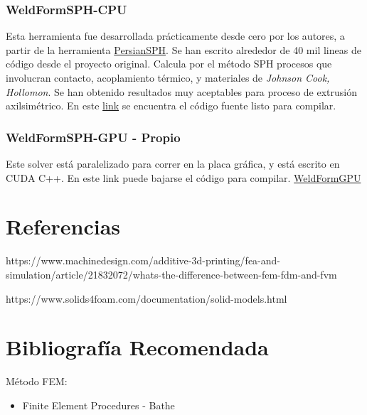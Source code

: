 \documentclass{article}
\begin{document}
\subsubsection{WeldFormSPH-CPU}
Esta herramienta fue desarrollada prácticamente desde cero por los autores, a partir de la herramienta \href{https://github.com/mghkorzani/persiansph}{PersianSPH}. Se han escrito alrededor de 40 mil lineas de código desde el proyecto original. Calcula por el método SPH procesos que involucran contacto, acoplamiento térmico, y materiales de \textit{Johnson Cook, Hollomon}. Se han obtenido resultados muy aceptables para proceso de extrusión axilsimétrico.
En este \href{https://github.com/luchete80/weldform}{link} se encuentra el código fuente listo para compilar. 

\subsubsection{WeldFormSPH-GPU - Propio}
Este solver está paralelizado para correr en la placa gráfica, y está escrito en CUDA C++.
En este link puede bajarse el código para compilar.
\href{https://github.com/luchete80/weldformGPU}{WeldFormGPU}
\section{Referencias}
https://www.machinedesign.com/additive-3d-printing/fea-and-simulation/article/21832072/whats-the-difference-between-fem-fdm-and-fvm 

https://www.solids4foam.com/documentation/solid-models.html

\section{Bibliografía Recomendada}
Método FEM:
\begin{itemize}
\item
Finite Element Procedures - Bathe
\end{itemize}
\end{document}
